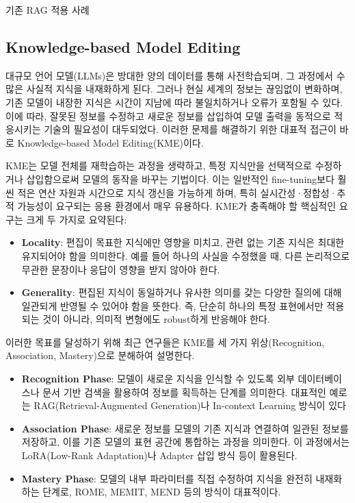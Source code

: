\documentclass[a4paper,fleqn]{cas-sc}
\begin{document}
기존 RAG 적용 사례

\subsection{Knowledge-based Model Editing}

대규모 언어 모델(LLMs)은 방대한 양의 데이터를 통해 사전학습되며, 그 과정에서 수많은 사실적 지식을 내재화하게 된다. 
그러나 현실 세계의 정보는 끊임없이 변화하며, 기존 모델이 내장한 지식은 시간이 지남에 따라 불일치하거나 오류가 포함될 수 있다. 
이에 따라, 잘못된 정보를 수정하고 새로운 정보를 삽입하여 모델 출력을 동적으로 적응시키는 기술의 필요성이 대두되었다. 
이러한 문제를 해결하기 위한 대표적 접근이 바로 Knowledge-based Model Editing(KME)이다.

KME는 모델 전체를 재학습하는 과정을 생략하고, 특정 지식만을 선택적으로 수정하거나 삽입함으로써 모델의 동작을 바꾸는 기법이다. 
이는 일반적인 fine-tuning보다 훨씬 적은 연산 자원과 시간으로 지식 갱신을 가능하게 하며, 특히 실시간성·정합성·추적 가능성이 요구되는 응용 환경에서 매우 유용하다.
KME가 충족해야 할 핵심적인 요구는 크게 두 가지로 요약된다:

\begin{itemize}
	\item{\textbf{Locality}:
	편집이 목표한 지식에만 영향을 미치고, 관련 없는 기존 지식은 최대한 유지되어야 함을 의미한다. 예를 들어 하나의 사실을 수정했을 때, 다른 논리적으로 무관한 문장이나 응답이 영향을 받지 않아야 한다.}

	\item{\textbf{Generality}:
	편집된 지식이 동일하거나 유사한 의미를 갖는 다양한 질의에 대해 일관되게 반영될 수 있어야 함을 뜻한다. 즉, 단순히 하나의 특정 표현에서만 적용되는 것이 아니라, 의미적 변형에도 robust하게 반응해야 한다.}
\end{itemize}
    
이러한 목표를 달성하기 위해 최근 연구들은 KME를 세 가지 위상(Recognition, Association, Mastery)으로 분해하여 설명한다. 

\begin{itemize}
    \item{\textbf{Recognition Phase}:
    모델이 새로운 지식을 인식할 수 있도록 외부 데이터베이스나 문서 기반 검색을 활용하여 정보를 획득하는 단계를 의미한다. 대표적인 예로는 RAG(Retrieval-Augmented Generation)나 In-context Learning 방식이 있다}
    \item{\textbf{Association Phase}:
    새로운 정보를 모델의 기존 지식과 연결하여 일관된 정보를 저장하고, 이를 기존 모델의 표현 공간에 통합하는 과정을 의미한다. 이 과정에서는 LoRA(Low-Rank Adaptation)나 Adapter 삽입 방식 등이 활용된다.}
    
    \item{\textbf{Mastery Phase}:
    모델의 내부 파라미터를 직접 수정하여 지식을 완전히 내재화하는 단계로, ROME, MEMIT, MEND 등의 방식이 대표적이다.}
\end{itemize}
\end{document}
